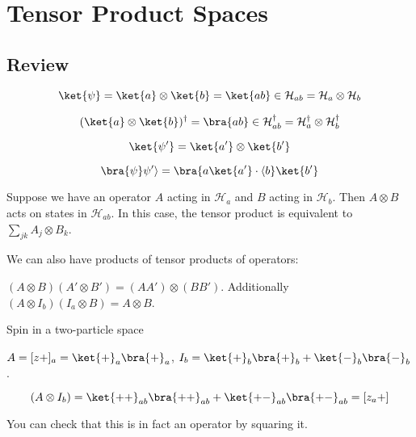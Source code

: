 \documentclass[a4paper,twoside,master.tex]{subfiles}
\begin{document}
\section{Tensor Product Spaces}
\label{sec:tensor_product_spaces}


\subsection{Review}
\label{sub:review}

\begin{equation}
\ket{\psi} = \ket{a}\otimes\ket{b} = \ket{ab}\in\mathcal{H}_{ab}=\mathcal{H}_a\otimes\mathcal{H}_b
\end{equation}

\begin{equation}
(\ket{a}\otimes\ket{b})^\dagger = \bra{ ab}\in\mathcal{H}_{ab}^\dagger=\mathcal{H}_a^\dagger\otimes\mathcal{H}_b^\dagger
\end{equation}

\begin{equation}
\ket{\psi'} = \ket{a'}\otimes\ket{b'}
\end{equation}

\begin{equation}
\bra{\psi}\psi'\rangle = \bra{ a\ket{a'}\cdot\langle b}\ket{b'}
\end{equation}

Suppose we have an operator $A$ acting in $\mathcal{H}_a$ and $B$
acting in $\mathcal{H}_b$. Then $A\otimes B$ acts on states in
$\mathcal{H}_{ab}$. In this case, the tensor product is equivalent to
$\sum_{jk}A_j\otimes B_k$.

We can also have products of tensor products of operators:

$(A\otimes B)(A'\otimes B') = (AA')\otimes(BB')$. Additionally
$(A\otimes I_b)(I_a\otimes B) = A\otimes B$.

\begin{ex}
    Spin in a two-particle space

$A=[z+]_a = \ket{+}_a\bra{+}_a$,
$I_b = \ket{+}_b\bra{ + }_b + \ket{-}_b\bra{ -}_b$.

\begin{equation}
(A\otimes I_b) = \ket{++}_{ab}\bra{ ++}_{ab} + \ket{+-}_{ab}\bra{ +-}_{ab} = [z_a+]
\end{equation}

You can check that this is in fact an operator by squaring it.
\end{ex}
\end{document}
